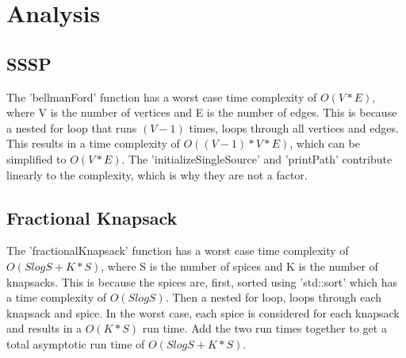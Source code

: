 \documentclass[letterpaper, 10pt,DIV=13]{scrartcl}
\numberwithin{equation}{section} %
\numberwithin{figure}{section} %
\numberwithin{table}{section} %
\begin{document}

\pagebreak


\section{Analysis}

\subsection{SSSP}
The 'bellmanFord' function has a worst case time complexity of $O(V*E)$, where V is the number of vertices and E is the number of edges. This is because a nested for loop that runs $(V-1)$ times, loops through all vertices and edges. This results in a time complexity of $O((V-1)*V*E)$, which can be simplified to $O(V*E)$. The 'initializeSingleSource' and 'printPath' contribute linearly to the complexity, which is why they are not a factor.

\subsection{Fractional Knapsack}
The 'fractionalKnapsack' function has a worst case time complexity of $O(SlogS + K*S)$, where S is the number of spices and K is the number of knapsacks. This is because the spices are, first, sorted using 'std::sort' which has a time complexity of $O(SlogS)$. Then a nested for loop, loops through each knapsack and spice. In the worst case, each spice is considered for each knapsack and results in a $O(K*S)$ run time. Add the two run times together to get a total asymptotic run time of $O(SlogS + K*S)$.




\pagebreak
\end{document}
